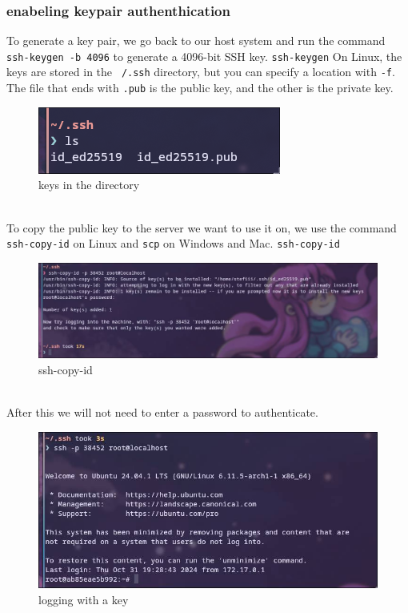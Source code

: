 \documentclass[a4paper]{article}
\begin{document}
\subsubsection{enabeling keypair authenthication}
To generate a key pair, we go back to our host system and run the command \texttt{ssh-keygen -b 4096} to generate a 4096-bit SSH key. \texttt{ssh-keygen}
On Linux, the keys are stored in the \texttt{~/.ssh} directory, but you can specify a location with \texttt{-f}. The file that ends with \texttt{.pub} is the public key, and the other is the private key.
\begin{figure}[h]
	\centering
	\includegraphics[scale=0.5]{images/keys-in-the-dir.png}
	\caption{keys in the directory}
\end{figure} \\
To copy the public key to the server we want to use it on, we use the command \texttt{ssh-copy-id} on Linux and \texttt{scp} on Windows and Mac. \texttt{ssh-copy-id}
\begin{figure}[h]
	\centering
	\includegraphics[scale=0.3]{images/ssh-copy-id.png}
	\caption{ssh-copy-id}
\end{figure} \\
After this we will not need to enter a password to authenticate.
\begin{figure}[h]
	\centering
	\includegraphics[scale=0.35]{images/login-with-key.png}
	\caption{logging with a key}
\end{figure} \\
\newpage
\end{document}
